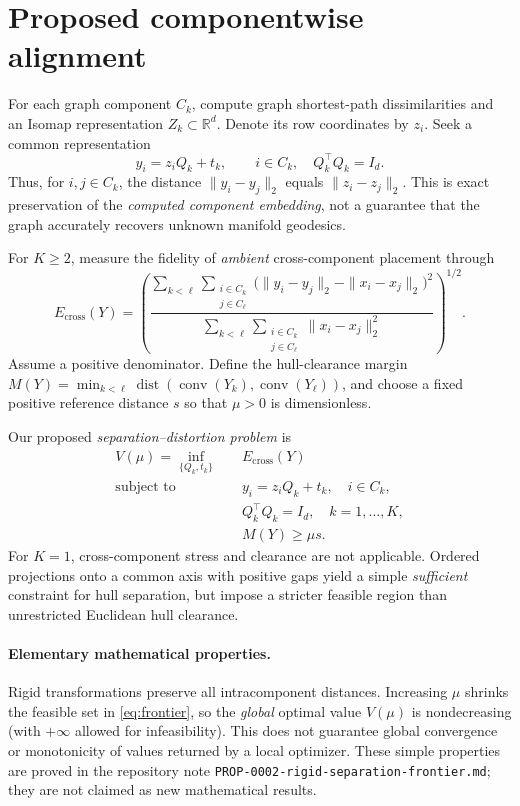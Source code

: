 \section{Proposed componentwise alignment}
For each graph component $C_k$, compute graph shortest-path dissimilarities
and an Isomap representation $Z_k\subset\mathbb{R}^{d}$. Denote its row
coordinates by $z_i$. Seek a common representation
\begin{equation}
  y_i=z_i Q_k+t_k,\qquad i\in C_k,\quad
  Q_k^\top Q_k=I_d .
  \label{eq:rigid}
\end{equation}
Thus, for $i,j\in C_k$, the distance $\|y_i-y_j\|_2$ equals
$\|z_i-z_j\|_2$. This is exact preservation of the \emph{computed component
embedding}, not a guarantee that the graph accurately recovers unknown
manifold geodesics.

For $K\ge 2$, measure the fidelity of \emph{ambient} cross-component
placement through
\begin{equation}
 E_{\mathrm{cross}}(Y)=
 \left(
 \frac{
 \displaystyle\sum_{k<\ell}
 \sum_{\substack{i\in C_k\\j\in C_\ell}}
 \big(\|y_i-y_j\|_2-\|x_i-x_j\|_2\big)^2
 }{
 \displaystyle\sum_{k<\ell}
 \sum_{\substack{i\in C_k\\j\in C_\ell}}
 \|x_i-x_j\|_2^2
 }\right)^{1/2}.
 \label{eq:cross}
\end{equation}
Assume a positive denominator. Define the hull-clearance margin
$M(Y)=\min_{k<\ell}\operatorname{dist}(
\operatorname{conv}(Y_k),\operatorname{conv}(Y_\ell))$, and choose a
fixed positive reference distance $s$ so that $\mu>0$ is dimensionless.

Our proposed \emph{separation--distortion problem} is
\begin{equation}
 \begin{aligned}
 V(\mu)=\inf_{\{Q_k,t_k\}}\quad &E_{\mathrm{cross}}(Y)\\
 \text{subject to}\quad
 & y_i=z_iQ_k+t_k,\quad i\in C_k,\\
 & Q_k^\top Q_k=I_d,\quad k=1,\ldots,K,\\
 & M(Y)\ge\mu s .
 \end{aligned}
 \label{eq:frontier}
\end{equation}
For $K=1$, cross-component stress and clearance are not applicable.
Ordered projections onto a common axis with positive gaps yield a simple
\emph{sufficient} constraint for hull separation, but impose a stricter
feasible region than unrestricted Euclidean hull clearance.

\paragraph{Elementary mathematical properties.}
Rigid transformations preserve all intracomponent distances.
Increasing $\mu$ shrinks the feasible set in \eqref{eq:frontier},
so the \emph{global} optimal value $V(\mu)$ is nondecreasing (with
$+\infty$ allowed for infeasibility). This does not guarantee global
convergence or monotonicity of values returned by a local optimizer.
These simple properties are proved in the repository note
\texttt{PROP-0002-rigid-separation-frontier.md}; they are not claimed
as new mathematical results.
